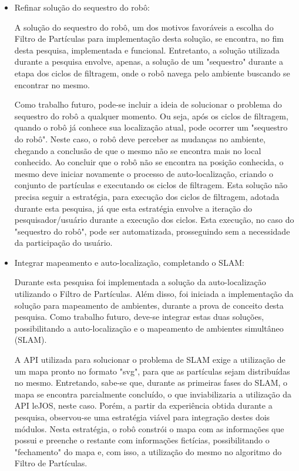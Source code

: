 \begin{itemize}
  \item Refinar solução do sequestro do robô:

    A solução do sequestro do robô, um dos motivos favoráveis a escolha do Filtro de Partículas para implementação desta solução,
    se encontra, no fim desta pesquisa, implementada e funcional. Entretanto, a solução utilizada durante a pesquisa envolve, apenas,
    a solução de um "sequestro" durante a etapa dos ciclos de filtragem, onde o robô navega pelo ambiente buscando se encontrar no mesmo.

    Como trabalho futuro, pode-se incluir a ideia de solucionar o problema do sequestro do robô a qualquer momento. Ou seja, após os ciclos
    de filtragem, quando o robô já conhece sua localização atual, pode ocorrer um "sequestro do robô". Neste caso, o robô deve perceber
    as mudanças no ambiente, chegando a conclusão de que o mesmo não se encontra mais no local conhecido. Ao concluir que o robô não se
    encontra na posição conhecida, o mesmo deve iniciar novamente o processo de auto-localização, criando o conjunto de partículas e
    executando os ciclos de filtragem. Esta solução não precisa seguir a estratégia, para execução dos ciclos de filtragem, adotada durante esta pesquisa,
    já que esta estratégia envolve a iteração do pesquisador/usuário durante a execução dos ciclos. Esta execução, no caso do "sequestro do robô",
    pode ser automatizada, prosseguindo sem a necessidade da participação do usuário.

  \item Integrar mapeamento e auto-localização, completando o SLAM:

    Durante esta pesquisa foi implementada a solução da auto-localização utilizando o Filtro de Partículas. Além disso, foi iniciada
    a implementação da solução para mapeamento de ambientes, durante a prova de conceito desta pesquisa. Como trabalho futuro,
    deve-se integrar estas duas soluções, possibilitando  a auto-localização e o mapeamento de ambientes simultâneo (SLAM).

    A API utilizada para solucionar o problema de SLAM exige a utilização de um mapa pronto no formato "svg", para que as partículas
    sejam distribuídas no mesmo. Entretando, sabe-se que, durante as primeiras fases do SLAM, o mapa se encontra parcialmente concluído,
    o que inviabilizaria a utilização da API leJOS, neste caso. Porém, a partir da experiência obtida durante a pesquisa, observou-se
    uma estratégia viável para integração destes dois módulos. Nesta estratégia, o robô constrói o mapa com as informações que possui
    e preenche o restante com informações fictícias, possibilitando o "fechamento" do mapa e, com isso, a utilização do mesmo
    no algoritmo do Filtro de Partículas.

\end{itemize}
